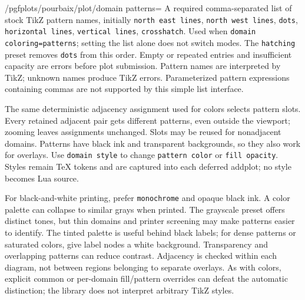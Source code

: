 \documentclass[a4paper,11pt]{ltxdoc}
\begin{document}
\begin{key}{/pgfplots/pourbaix/plot/domain patterns=}
A required comma-separated list of stock TikZ pattern names, initially
\texttt{north east lines}, \texttt{north west lines}, \texttt{dots},
\texttt{horizontal lines}, \texttt{vertical lines}, \texttt{crosshatch}.
Used when \texttt{domain coloring=patterns}; setting the list alone does not
switch modes. The \texttt{hatching} preset removes \texttt{dots} from this order.
Empty or repeated entries and insufficient capacity are errors before plot
submission. Pattern names are interpreted by TikZ; unknown names produce TikZ
errors. Parameterized pattern expressions containing commas are not supported
by this simple list interface.

The same deterministic adjacency assignment used for colors selects pattern
slots. Every retained adjacent pair gets different patterns, even outside the
viewport; zooming leaves assignments unchanged. Slots may be reused for
nonadjacent domains. Patterns have black ink and transparent backgrounds,
so they also work for overlays. Use \texttt{domain style} to change
\texttt{pattern color} or \texttt{fill opacity}. Styles remain TeX tokens and
are captured into each deferred addplot; no style becomes Lua source.
\end{key}
For black-and-white printing, prefer \texttt{monochrome} and opaque black ink.
A color palette can collapse to similar grays when printed. The grayscale
preset offers distinct tones, but thin domains and printer screening may make
patterns easier to identify. The tinted palette is useful behind black labels;
for dense patterns or saturated colors, give label nodes a white background.
Transparency and overlapping patterns can reduce contrast. Adjacency is checked
within each diagram, not between regions belonging to separate overlays.
As with colors, explicit common or per-domain fill/pattern overrides can defeat
the automatic distinction; the library does not interpret arbitrary TikZ styles.

\end{document}
